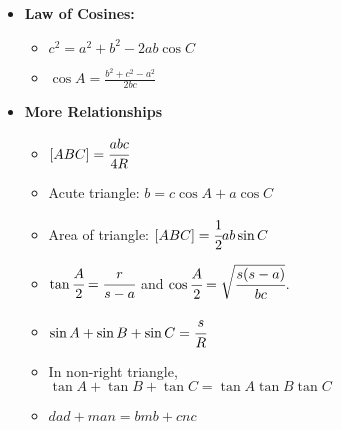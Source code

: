 \documentclass[letterpaper,12pt]{article}
\begin{document}
\begin{itemize}
        \item \textbf{Law of Cosines:}
            \begin{itemize}
            \item $c^2 = a^2 + b^2 - 2ab \cos C$
            \item $\cos A = \frac{b^2 + c^2 - a^2}{2bc}$            
            \end{itemize}
        \item \textbf{More Relationships}
            \begin{itemize}
            \item $[ABC]=\cfrac{abc}{4R}$
            \item Acute triangle: $b=c\cos A +a\cos C$
            \item Area of triangle: $[ABC]=\cfrac{1}{2}ab\sin C$
            \item $\tan\cfrac{A}{2}=\cfrac{r}{s-a}$ and $\cos\cfrac{A}{2}=\sqrt{\cfrac{s(s-a)}{bc}}$.
            \item $\sin A + \sin B + \sin C = \cfrac{s}{R}$
            \item In non-right triangle, \\$\tan A + \tan B + \tan C = \tan A\tan B \tan C$
            \item $dad+man=bmb+cnc$
            \end{itemize}
    \end{itemize}
\end{document}
